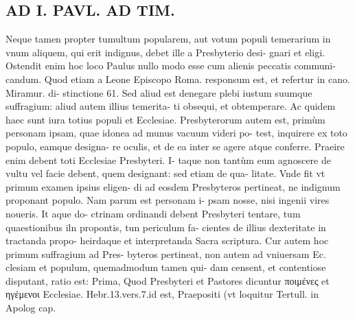 \documentclass{article}
\begin{document}
\begin{pages}
\section*{AD I. PAVL. AD TIM. }
\marginpar{[ p.552 ]}\pstart Neque tamen propter tumultum popularem, aut votum populi temerarium in vnum aliquem, qui erit indignus, debet ille a Presbyterio desi- gnari et eligi. Ostendit enim hoc loco Paulus nullo modo esse cum alienis peccatis communi- candum. Quod etiam a Leone Episcopo Roma. responsum est, et refertur in cano. Miramur. di- stinctione 61. Sed aliud est denegare plebi iustum suumque suffragium: aliud autem illius temerita- ti obsequi, et obtemperare. Ac quidem haec sunt iura totius populi et Ecclesiae.  \pend\pstart Presbyterorum autem est, primùm personam ipsam, quae idonea ad munus vacuum videri po- test, inquirere ex toto populo, eamque designa- re oculis, et de ea inter se agere atque conferre. Praeire enim debent toti Ecclesiae Presbyteri. I- taque non tantùm eum agnoscere de vultu vel facie debent, quem designant: sed etiam de qua- litate. Vnde fit vt primum examen ipsius eligen- di ad eosdem Presbyteros pertineat, ne indignum proponant populo. Nam parum est personam i- psam nosse, nisi ingenii vires noueris. It aque do- ctrinam ordinandi debent Presbyteri tentare, tum quaestionibus iln propontis, tun periculum fa- cientes de illius dexteritate in tractanda propo- heirdaque et interpretanda Sacra scriptura.  \pend\pstart Cur autem hoc primum suffragium ad Pres- byteros pertineat, non autem ad vniuersam Ec. clesiam et populum, quemadmodum tamen qui- dam censent, et contentiose disputant, ratio est:  \pend\pstart Prima, Quod Presbyteri et Pastores dicuntur ποιμένες et ηγέμενοι Ecclesiae. Hebr.13.vers.7.id est, Praepositi (vt loquitur Tertull. in Apolog cap.  \pend

\end{pages}
\end{document}
